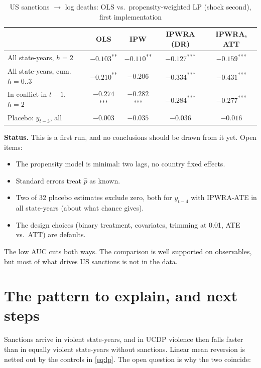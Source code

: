 \documentclass[11pt,a4paper]{article}
\newcommand{\sig}[1]{\textsuperscript{#1}}
\begin{document}
\begin{table}[H]
\centering\small
\caption{US sanctions $\rightarrow$ log deaths: OLS vs.\ propensity-weighted LP (shock second), first implementation}
\label{tab:dr}
\begin{tabular}{@{}lcccc@{}}
\toprule
 & OLS & IPW & IPWRA (DR) & IPWRA, ATT \\
\midrule
All state-years, $h=2$            & $-0.103$\sig{**}  & $-0.110$\sig{**}  & $-0.127$\sig{***} & $-0.159$\sig{***} \\
All state-years, cum.\ $h=0..3$   & $-0.210$\sig{**}  & $-0.206$          & $-0.334$\sig{***} & $-0.431$\sig{***} \\
In conflict in $t-1$, $h=2$       & $-0.274$\sig{***} & $-0.282$\sig{***} & $-0.284$\sig{***} & $-0.277$\sig{***} \\
Placebo: $y_{t-3}$, all           & $-0.003$          & $-0.035$          & $-0.036$          & $-0.016$ \\
\bottomrule
\end{tabular}
\end{table}

\textbf{Status.} This is a first run, and no conclusions should be drawn from it yet. Open items:
\begin{itemize}[leftmargin=*]
\item The propensity model is minimal: two lags, no country fixed effects.
\item Standard errors treat $\hat p$ as known.
\item Two of 32 placebo estimates exclude zero, both for $y_{t-4}$ with IPWRA-ATE in all state-years (about what chance gives).
\item The design choices (binary treatment, covariates, trimming at 0.01, ATE vs.\ ATT) are defaults.
\end{itemize}
The low AUC cuts both ways. The comparison is well supported on observables, but most of what drives US sanctions
is not in the data.

\section{The pattern to explain, and next steps}
\label{sec:next}

Sanctions arrive in violent state-years, and in UCDP violence then falls faster than in equally violent
state-years without sanctions. Linear mean reversion is netted out by the controls in \eqref{eq:lp}. The open
question is why the two coincide:
\end{document}
